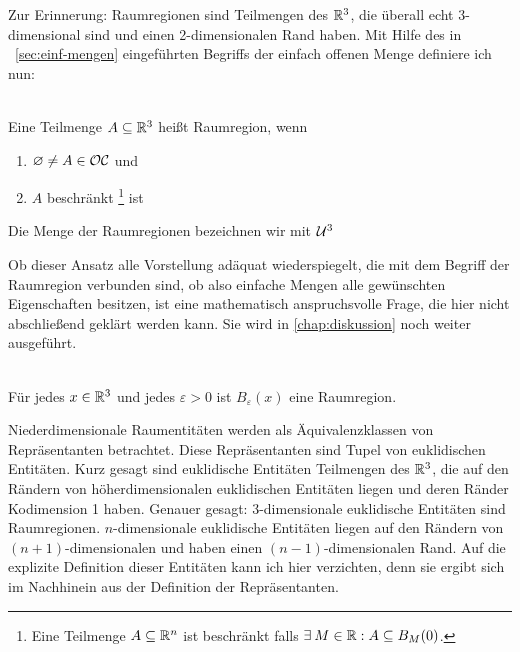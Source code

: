    Zur Erinnerung: Raumregionen sind Teilmengen des $\mathbb{R}^3$, die überall echt 3-dimensional sind und einen 2-dimensionalen Rand haben.%
    Mit Hilfe des in ~\ref{sec:einf-mengen} eingeführten Begriffs der einfach offenen Menge definiere ich nun:
    
    \begin{dfn}[Raumregion]\ \\
        Eine Teilmenge $A \subseteq \mathbb{R}^3$ heißt Raumregion, wenn
        \begin{enumerate}
            \item $\varnothing \neq A \in \mathcal{OC}$ und
            \item $A$ beschränkt%
                  \footnote{Eine Teilmenge $A \subseteq \mathbb{R}^n$ ist beschränkt falls $\exists\: M \in \mathbb{R} : A \subseteq B_M(0)$.}
                  ist
        \end{enumerate}
        Die Menge der Raumregionen bezeichnen wir mit $\mathcal{U}^3$
    \end{dfn}
    Ob dieser Ansatz alle Vorstellung adäquat wiederspiegelt, die mit dem Begriff der Raumregion verbunden sind, ob also einfache Mengen alle gewünschten Eigenschaften besitzen, ist eine mathematisch anspruchsvolle Frage, die hier nicht abschließend geklärt werden kann. Sie wird in \ref{chap:diskussion} noch weiter ausgeführt.
    
    \begin{bsp}\ \\
        Für jedes $x \in \mathbb{R}^3$ und jedes $\varepsilon > 0$ ist $B_\varepsilon(x)$ eine Raumregion.
    \end{bsp}
    
    
    Niederdimensionale Raumentitäten werden als Äquivalenzklassen von Repräsentanten betrachtet.
    Diese Repräsentanten sind Tupel von euklidischen Entitäten.%
    Kurz gesagt sind euklidische Entitäten Teilmengen des $\mathbb{R}^3$, die auf den Rändern von höherdimensionalen euklidischen Entitäten liegen und deren Ränder Kodimension 1 haben.
    Genauer gesagt: 3-dimensionale euklidische Entitäten sind Raumregionen.
    $n$-dimensionale euklidische Entitäten liegen auf den Rändern von $(n+1)$-dimensionalen und haben einen $(n-1)$-dimensionalen Rand.
    Auf die explizite Definition dieser Entitäten kann ich hier verzichten, denn sie ergibt sich im Nachhinein aus der Definition der Repräsentanten.

